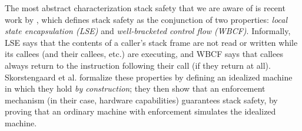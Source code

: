\documentclass[acmsmall,review,anonymous]{acmart}\settopmatter{printfolios=true,printccs=false,printacmref=false}
\begin{document}
The most abstract characterization stack safety that we are aware of is
recent work by \citet{Skorstengaard+19b,Skorstengaard+19}, which defines stack safety as the conjunction of two
properties:
{\em local state encapsulation (LSE)} and {\em well-bracketed control flow (WBCF)}.
Informally, LSE says that the contents of
a caller's stack frame are not read or written while its callees (and their callees, etc.) are
executing, and WBCF says that callees always
return to the instruction following their call (if they return at all).
Skorstengaard et al.{} formalize these properties by defining an idealized
machine in which they hold {\em by construction};
they then show that an enforcement
mechanism (in their case, hardware capabilities) guarantees stack safety, by
proving that an ordinary machine with enforcement simulates the idealized
machine.
\end{document}
